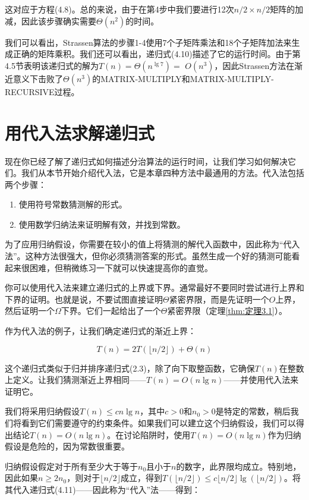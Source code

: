 \documentclass[lang=cn,newtx,10pt,scheme=chinese]{elegantbook}
\begin{document}
这对应于方程(4.8)。总的来说，由于在第4步中我们要进行12次$n/2\times n/2$矩阵的加减，因此该步骤确实需要$\Theta(n^2)$的时间。

我们可以看出，Strassen算法的步骤1-4使用7个子矩阵乘法和18个子矩阵加法来生成正确的矩阵乘积。我们还可以看出，递归式(4.10)描述了它的运行时间。由于第4.5节表明该递归式的解为$T(n)=\Theta(n^{\lg 7})=$ $O(n^3)$，因此Strassen方法在渐近意义下击败了$\Theta(n^3)$的MATRIX-MULTIPLY和MATRIX-MULTIPLY-RECURSIVE过程。


\section{用代入法求解递归式}\label{section-4.3}

现在你已经了解了递归式如何描述分治算法的运行时间，让我们学习如何解决它们。我们从本节开始介绍代入法，它是本章四种方法中最通用的方法。代入法包括两个步骤：

\begin{enumerate}
\item 使用符号常数猜测解的形式。
\item 使用数学归纳法来证明解有效，并找到常数。
\end{enumerate}

为了应用归纳假设，你需要在较小的值上将猜测的解代入函数中，因此称为``代入法''。这种方法很强大，但你必须猜测答案的形式。虽然生成一个好的猜测可能看起来很困难，但稍微练习一下就可以快速提高你的直觉。

你可以使用代入法来建立递归式的上界或下界。通常最好不要同时尝试进行上界和下界的证明。也就是说，不要试图直接证明$\Theta$紧密界限，而是先证明一个$O$上界，然后证明一个$\Omega$下界。它们一起给出了一个$\Theta$紧密界限（定理\ref{thm:定理3.1}）。

作为代入法的例子，让我们确定递归式的渐近上界：

\begin{equation}
T(n)=2 T(\lfloor n / 2\rfloor)+\Theta(n)
\end{equation}

这个递归式类似于归并排序递归式(2.3)，除了向下取整函数，它确保$T(n)$在整数上定义。让我们猜测渐近上界相同——$T(n)=O(n \lg n)$——并使用代入法来证明它。

我们将采用归纳假设$T(n) \leq c n \lg n$，其中$c>0$和$n_0>0$是特定的常数，稍后我们将看到它们需要遵守的约束条件。如果我们可以建立这个归纳假设，我们可以得出结论$T(n)=O(n \lg n)$。在讨论陷阱时，使用$T(n)=O(n \lg n)$作为归纳假设是危险的，因为常数很重要。

归纳假设假定对于所有至少大于等于$n_0$且小于$n$的数字，此界限均成立。特别地，因此如果$n \geq 2 n_0$，则对于$\lfloor n / 2\rfloor$成立，得到$T(\lfloor n / 2\rfloor) \leq c\lfloor n / 2\rfloor \lg (\lfloor n / 2\rfloor)$。将其代入递归式(4.11)——因此称为“代入”法——得到：
\end{document}
